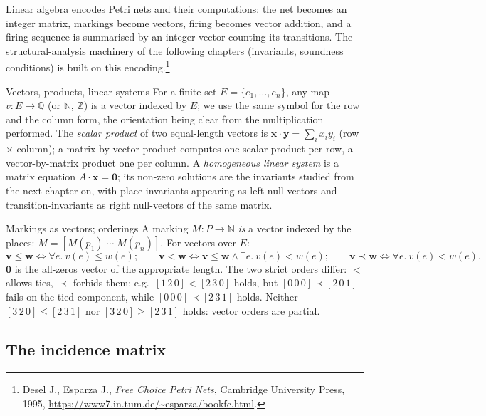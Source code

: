 Linear algebra encodes Petri nets and their computations: the net becomes an integer matrix, markings become vectors, firing becomes vector addition, and a firing sequence is summarised by an integer vector counting its transitions. The structural-analysis machinery of the following chapters (invariants, soundness conditions) is built on this encoding.\footnote{Desel J., Esparza J., \emph{Free Choice Petri Nets}, Cambridge University Press, 1995, \url{https://www7.in.tum.de/~esparza/bookfc.html}.}

\begin{definitionbox}{Vectors, products, linear systems}
For a finite set $E = \{e_1, \ldots, e_n\}$, any map $v : E \to \mathbb{Q}$ (or $\mathbb{N}$, $\mathbb{Z}$) is a vector indexed by $E$; we use the same symbol for the row and the column form, the orientation being clear from the multiplication performed. The \emph{scalar product} of two equal-length vectors is $\mathbf{x} \cdot \mathbf{y} = \sum_i x_i y_i$ (row $\times$ column); a matrix-by-vector product computes one scalar product per row, a vector-by-matrix product one per column. A \emph{homogeneous linear system} is a matrix equation $A \cdot \mathbf{x} = \mathbf{0}$; its non-zero solutions are the invariants studied from the next chapter on, with place-invariants appearing as left null-vectors and transition-invariants as right null-vectors of the same matrix.
\end{definitionbox}

\begin{definitionbox}{Markings as vectors; orderings}
A marking $M : P \to \mathbb{N}$ \emph{is} a vector indexed by the places: $M = [M(p_1)\; \cdots\; M(p_n)]$. For vectors over $E$:
\[
  \mathbf{v} \leq \mathbf{w} \iff \forall e.\ v(e) \leq w(e); \qquad
  \mathbf{v} < \mathbf{w} \iff \mathbf{v} \leq \mathbf{w} \wedge \exists e.\ v(e) < w(e); \qquad
  \mathbf{v} \prec \mathbf{w} \iff \forall e.\ v(e) < w(e).
\]
$\mathbf{0}$ is the all-zeros vector of the appropriate length. The two strict orders differ: $<$ allows ties, $\prec$ forbids them: e.g.\ $[1\,2\,0] < [2\,3\,0]$ holds, but $[0\,0\,0] \prec [2\,0\,1]$ fails on the tied component, while $[0\,0\,0] \prec [2\,3\,1]$ holds. Neither $[3\,2\,0] \leq [2\,3\,1]$ nor $[3\,2\,0] \geq [2\,3\,1]$ holds: vector orders are partial.
\end{definitionbox}

\subsection{The incidence matrix}


